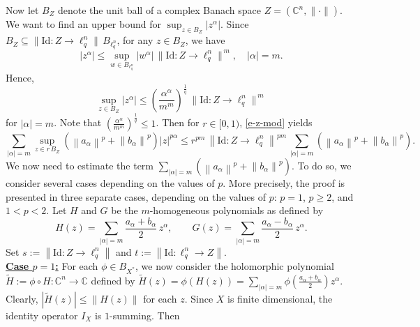 \documentclass[a4paper,11pt, reqno]{amsart}
\theoremstyle{definition}
\newcommand{\norm}[1]{\left\lVert#1\right\rVert}
\begin{document}
	Now let $B_Z$ denote the unit ball of a complex Banach space $Z = (\mathbb{C}^n, \|\cdot\|)$.
	We want to find an upper bound for $\sup_{z \in B_Z} |z^\alpha|$.
	Since $B_Z \subseteq \|\mathrm{Id} : Z \to \ell_q^n\|\, B_{\ell_q^n} $, for any $z \in B_Z$, we have  
	\[
	|z^\alpha|
	\le
	\sup_{w \in B_{\ell_q^n}} |w^\alpha|
	\,
	\|\mathrm{Id} : Z \to \ell_q^n\|^{\,m}, \,\,\,\,\,\, |\alpha|=m.
	\]
	Hence,
	\begin{equation} \label{e-z-mod}
		\sup_{z \in B_Z} |z^\alpha|
		\le
		\left(\frac{\alpha^\alpha}{m^m}\right)^{\frac{1}{q}}
		\,
		\|\mathrm{Id} : Z \to \ell_q^n\|^{\,m}
	\end{equation}
for $|\alpha|=m$. Note that $\left(\frac{\alpha^\alpha}{m^m}\right)^{\frac{1}{q}} \leq 1$. Then for $r \in [0,1)$, \eqref{e-z-mod} yields
	\begin{equation} \label{snd-e-4.6}
		\sum_{|\alpha|=m} \sup_{z \in r \, B_{Z}} (\norm{a_{\alpha}}^p+\norm{b_{\alpha}}^p)|z|^{p\alpha} \leq r^{pm}\, \norm{\mathrm{Id}: Z \rightarrow \ell^n_q}^{pm}\,\sum_{|\alpha|=m}  (\norm{a_{\alpha}}^p+\norm{b_{\alpha}}^p).
	\end{equation}
	We now need to estimate the term $\sum_{|\alpha|=m}  (\norm{a_{\alpha}}^p+\norm{b_{\alpha}}^p)$. To do so, we consider several cases depending on the values of $p$. More precisely, the proof is presented in three separate cases, depending on the values of $p$: $p=1$, $p\geq 2$, and $1<p<2$. Let $H$ and $G$ be the $m$-homogeneous polynomials as defined by 
	\[
	H(z)=\sum_{|\alpha|=m}\frac{a_\alpha+b_\alpha}{2}\,z^\alpha,
	\qquad
	G(z)=\sum_{|\alpha|=m}\frac{a_\alpha-b_\alpha}{2}\,z^\alpha.
	\]
	 Set $s:=\norm{\mathrm{Id}: Z \rightarrow \ell^n_q}$ and $t:=\norm{\mathrm{Id}:  \ell^n_q\rightarrow Z}$. \\
	\underline{{\bf Case $p=1$:}} 
	For each $\phi \in B_{X^{*}}$, we now consider the holomorphic polynomial $\tilde{H}:=\phi \circ H:\mathbb{C}^n \rightarrow \mathbb{C}$ defined by
	$\tilde{H}(z)=\phi(H(z))= \sum_{|\alpha|=m} \phi\left(\frac{a_{\alpha} + b_{\alpha}}{2}\right) z^{\alpha}$.
	Clearly, $|\tilde{H}(z)| \leq \norm{H(z)}$ for each $z$. Since $X$ is finite dimensional, the identity operator $I_{X}$ is $1$-summing. Then 
\end{document}
